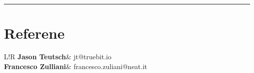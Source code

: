 \documentclass[10pt]{article}
\newcommand\VRule{\color{lightgray}\vrule width 0.5pt}
\begin{document}
\vspace{5mm}
\hrule
\vspace{5mm}

\section*{Referene}
\begin{longtable}{L!{\VRule}R}
  {\bf Jason Teutsch}& jt@truebit.io\\[5pt]
  {\bf Francesco Zulliani}& francesco.zuliani@neat.it\\[5pt]
\end{longtable}
\end{document}
